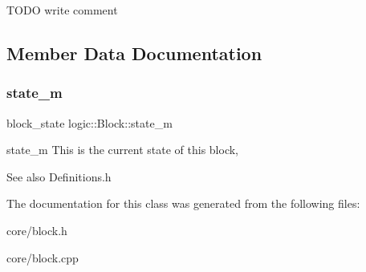 T\+O\+DO write comment 

\subsection{Member Data Documentation}
\mbox{\label{classlogic_1_1_block_ae267e23894435a8a93368db5af0519be}} 
\subsubsection{\texorpdfstring{state\+\_\+m}{state\_m}}
{\footnotesize\ttfamily block\+\_\+state logic\+::\+Block\+::state\+\_\+m\hspace{0.3cm}{\ttfamily [private]}}



state\+\_\+m This is the current state of this block, 

\begin{DoxySeeAlso}{See also}
Definitions.\+h 
\end{DoxySeeAlso}


The documentation for this class was generated from the following files\+:\begin{DoxyCompactItemize}
\item 
core/block.\+h\item 
core/block.\+cpp\end{DoxyCompactItemize}

